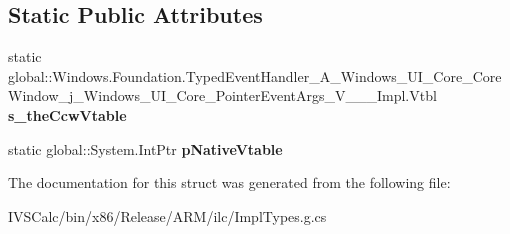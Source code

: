 \subsection*{Static Public Attributes}
\begin{DoxyCompactItemize}
\item 
\mbox{\label{struct_windows_1_1_foundation_1_1_typed_event_handler___a___windows___u_i___core___core_window__9847d8e12b1e96286fbe9b33a69b897e_a5021fab3a87caa06042b93eb71fdb992}} 
static global\+::\+Windows.\+Foundation.\+Typed\+Event\+Handler\+\_\+\+A\+\_\+\+Windows\+\_\+\+U\+I\+\_\+\+Core\+\_\+\+Core\+Window\+\_\+j\+\_\+\+Windows\+\_\+\+U\+I\+\_\+\+Core\+\_\+\+Pointer\+Event\+Args\+\_\+\+V\+\_\+\+\_\+\+\_\+\+Impl.\+Vtbl {\bfseries s\+\_\+the\+Ccw\+Vtable}
\item 
\mbox{\label{struct_windows_1_1_foundation_1_1_typed_event_handler___a___windows___u_i___core___core_window__9847d8e12b1e96286fbe9b33a69b897e_aef710e9f42445586e11810af51f65075}} 
static global\+::\+System.\+Int\+Ptr {\bfseries p\+Native\+Vtable}
\end{DoxyCompactItemize}


The documentation for this struct was generated from the following file\+:\begin{DoxyCompactItemize}
\item 
I\+V\+S\+Calc/bin/x86/\+Release/\+A\+R\+M/ilc/Impl\+Types.\+g.\+cs\end{DoxyCompactItemize}
